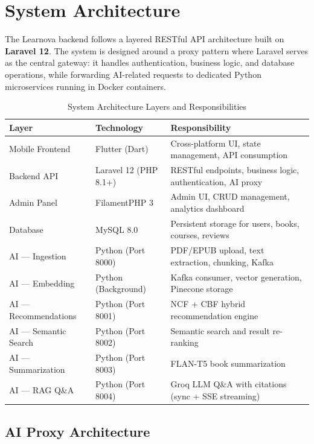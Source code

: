 \section{System Architecture}
\label{sec:ch4arch}

The Learnova backend follows a layered RESTful API architecture built on
\textbf{Laravel 12}. The system is designed around a proxy pattern where
Laravel serves as the central gateway: it handles authentication, business
logic, and database operations, while forwarding AI-related requests to
dedicated Python microservices running in Docker containers.

\begin{table}[H]
\centering
\caption{System Architecture Layers and Responsibilities}
\label{tab:arch}
\begin{tabularx}{\textwidth}{|l|l|X|}
\hline
\textbf{Layer} & \textbf{Technology} & \textbf{Responsibility} \\
\hline
Mobile Frontend    & Flutter (Dart)         & Cross-platform UI, state management, API consumption \\
\hline
Backend API        & Laravel 12 (PHP 8.1+)  & RESTful endpoints, business logic, authentication, AI proxy \\
\hline
Admin Panel        & FilamentPHP 3          & Admin UI, CRUD management, analytics dashboard \\
\hline
Database           & MySQL 8.0              & Persistent storage for users, books, courses, reviews \\
\hline
AI --- Ingestion   & Python (Port 8000)     & PDF/EPUB upload, text extraction, chunking, Kafka \\
\hline
AI --- Embedding   & Python (Background)    & Kafka consumer, vector generation, Pinecone storage \\
\hline
AI --- Recommendations & Python (Port 8001) & NCF + CBF hybrid recommendation engine \\
\hline
AI --- Semantic Search & Python (Port 8002) & Semantic search and result re-ranking \\
\hline
AI --- Summarization   & Python (Port 8003) & FLAN-T5 book summarization \\
\hline
AI --- RAG Q\&A    & Python (Port 8004)     & Groq LLM Q\&A with citations (sync + SSE streaming) \\
\hline
\end{tabularx}
\end{table}

\subsection{AI Proxy Architecture}

